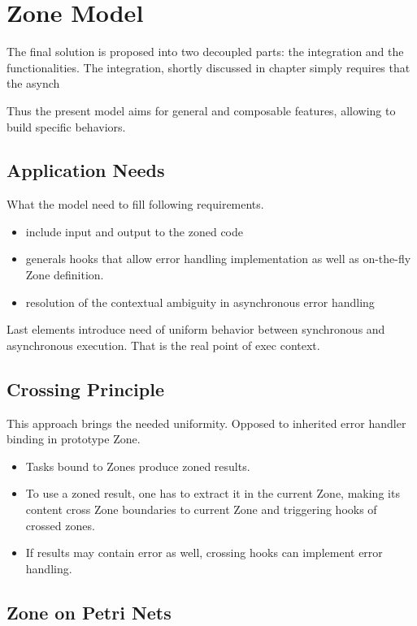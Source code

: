 
\chapter{Zone Model}
\label{ch:zone}

The final solution is proposed into two decoupled parts: the integration and the functionalities. The integration, shortly discussed in chapter \label{ch:asyncworld} simply requires that the asynch

Thus the present model aims for general and composable features, allowing to build specific behaviors.

\section{Application Needs}

What the model need to fill following requirements.

\begin{itemize}
\item include input and output to the zoned code
\item generals hooks that allow error handling implementation as well as on-the-fly Zone definition.
\item resolution of the contextual ambiguity in asynchronous error handling
\end{itemize}

Last elements introduce need of uniform behavior between synchronous and asynchronous execution.
That is the real point of exec context.

\section{Crossing Principle}

This approach brings the needed uniformity. Opposed to inherited error handler binding in prototype Zone.

\begin{itemize}
\item Tasks bound to Zones produce zoned results.
\item To use a zoned result, one has to extract it in the current Zone, making its content cross Zone boundaries to current Zone and triggering hooks of crossed zones.
\item If results may contain error as well, crossing hooks can implement error handling.
\end{itemize}

\section{Zone on Petri Nets}

